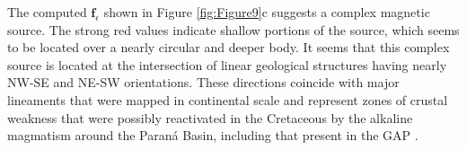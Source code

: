 The computed $\mathbf{f}_{\epsilon}$ shown in Figure \ref{fig:Figure9}c suggests a complex 
magnetic source. The strong red values indicate shallow portions of the source, which 
seems to be located over a nearly circular and deeper body. 
It seems that this complex source is located at the intersection of linear geological 
structures having nearly NW-SE and NE-SW orientations. 
These directions coincide with major lineaments that were mapped in continental scale and 
represent zones of crustal weakness that were possibly reactivated in the Cretaceous by 
the alkaline magmatism around the Paraná Basin, including that present in the GAP 
\citep{marangoni_mantovani_2013}.


